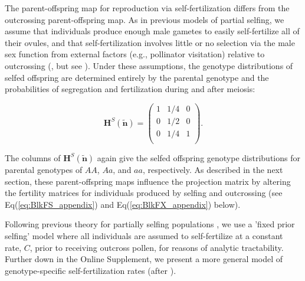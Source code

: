 \documentclass[11pt]{article}
\def\mbf#1{\mathbf{#1}}
\begin{document}
The parent-offspring map for reproduction via self-fertilization differs from the outcrossing parent-offspring map. As in previous models of partial selfing, we assume that individuals produce enough male gametes to easily self-fertilize all of their ovules, and that self-fertilization involves little or no selection via the male sex function from external factors (e.g., pollinator visitation) relative to outcrossing (\citealt{Charlesworth1978a,JordanConnallon2014,Olito2017}, but see \citealt{Tazzyman2015}). Under these assumptions, the genotype distributions of selfed offspring are determined entirely by the parental genotype and the probabilities of segregation and fertilization during and after meiosis: 
\begin{linenomath*}
\begin{equation} \label{eq:HS}
	\mbf{H}^S(\tilde{\mbf{n}}) = 
			\left(
			\begin{array}{ccc}
				1 & 1/4 & 0 \\
				0 & 1/2 & 0 \\
				0 & 1/4 & 1 \\
			\end{array} \right).
\end{equation}
\end{linenomath*}
\noindent The columns of $\mbf{H}^S(\tilde{\mbf{n}})$ again give the selfed offspring genotype distributions for parental genotypes of $AA$, $Aa$, and $aa$, respectively. As described in the next section, these parent-offspring maps influence the projection matrix by altering the fertility matrices for individuals produced by selfing and outcrossing (see Eq(\ref{eq:BlkFS_appendix}) and Eq(\ref{eq:BlkFX_appendix}) below).

Following previous theory for partially selfing populations \cite[e.g.,][]{Charlesworth2010,JordanConnallon2014,Glemin2021}, we use a 'fixed prior selfing' model where all individuals are assumed to self-fertilize at a constant rate, $C$, prior to receiving outcross pollen, for reasons of analytic tractability. Further down in the Online Supplement, we present a more general model of genotype-specific self-fertilization rates (after \citealt{JordanConnallon2014}).
\end{document}
